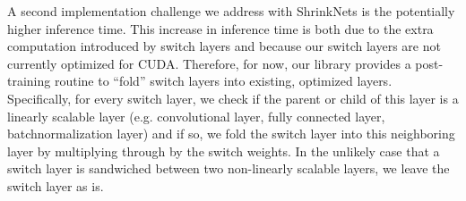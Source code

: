 A second implementation challenge we address with ShrinkNets is the potentially
higher inference time.
This increase in inference time is both due to the extra computation introduced 
by switch layers and because our switch layers are not currently optimized for 
CUDA.
Therefore, for now, our library provides a post-training routine to ``fold''
switch layers into existing, optimized layers.
Specifically, for every switch layer, we check if the parent or child of this 
layer is a linearly scalable layer (e.g. convolutional layer, fully connected layer,
batchnormalization layer) and if so, we fold the switch layer into this 
neighboring layer by multiplying through by the switch weights.
In the unlikely case that a switch layer is sandwiched between two non-linearly
scalable layers, we leave the switch layer as is.












